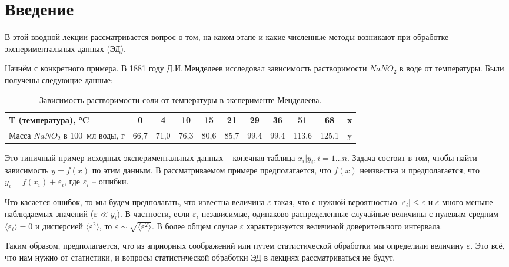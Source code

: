 \section{Введение}

В этой вводной лекции рассматривается вопрос о том, на каком этапе и какие численные методы возникают при обработке экспериментальных данных (ЭД).

Начнём с конкретного примера. В 1881 году Д.И.\,Менделеев исследовал зависимость растворимости $NaNO_{2}$ в воде от температуры. Были получены следующие данные:

\begin{table}[h]
	\small
	\caption{Зависимость растворимости соли от температуры в эксперименте Менделеева.}
	\label{table:mendeleev}
	\begin{tabular}{ p{} *{10}{|c} }

		T (температура), °C & 0 & 4 & 10 & 15 & 21& 29& 36& 51&68 & x \\
		\hline
		Масса $NaNO_{2}$ в 100~мл воды, г&
		66,7&71,0&76,3&80,6&85,7&99,4&99,4&113,6&125,1& y \\

	\end{tabular}
	
\end{table}

Это типичный пример исходных экспериментальных данных -- конечная таблица $x_i | y_i, i=1\dots n$. Задача состоит в том, чтобы найти зависимость $y = f(x)$ по этим данным. В рассматриваемом примере предполагается, что $f(x)$ неизвестна и предполагается, что $y_i = f(x_i) + \varepsilon _i$, где $\varepsilon _ i$ -- ошибки.

Что касается ошибок, то мы будем предполагать, что известна величина $\varepsilon$ такая, что с нужной вероятностью $|\varepsilon _i| \leq \varepsilon$ и $\varepsilon$ много меньше наблюдаемых значений ($\varepsilon \ll y_i$). В частности, если $\varepsilon_i$ независимые, одинаково распределенные случайные величины с нулевым средним $\langle \varepsilon_i \rangle = 0$ и дисперсией $\langle \varepsilon^2 \rangle$, то $\varepsilon \sim \sqrt{\langle \varepsilon^2 \rangle }$. В более общем случае $\varepsilon$ характеризуется величиной доверительного интервала. 

Таким образом, предполагается, что из априорных соображений или путем статистической обработки мы определили величину $\varepsilon$. Это всё, что нам нужно от статистики, и вопросы статистической обработки ЭД в лекциях рассматриваться не будут.



